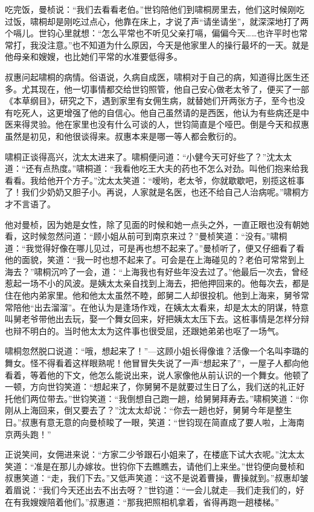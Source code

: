 \par 吃完饭，曼桢说：“我们去看看老伯。”世钧陪他们到啸桐房里去，他们这时候刚吃过饭，啸桐却是刚吃过点心，他靠在床上，才说了声“请坐请坐”，就深深地打了两个嗝儿。世钧心里就想：“怎么平常也不听见父亲打嗝，偏偏今天……也许平时也常常打，我没注意。”也不知道为什么原因，今天是他家里人的操行最坏的一天。就是他母亲和嫂嫂，也比她们平常的水准要低得多。
\par 叔惠问起啸桐的病情。俗语说，久病自成医，啸桐对于自己的病，知道得比医生还多。尤其现在，他一切事情都交给世钧照管，他自己安心做老太爷了，便买了一部《本草纲目》，研究之下，遇到家里有女佣生病，就替她们开两张方子，至今也没有吃死人，这更增强了他的自信心。他自己虽然请的是西医，他认为有些病还是中医来得灵验。他在家里也没有什么可谈的人，世钧简直是个哑巴。倒是今天和叔惠虽然是初见，和他很谈得来。叔惠本来是哪一等人都会敷衍的。
\par 啸桐正谈得高兴，沈太太进来了。啸桐便问道：“小健今天可好些了？”沈太太道：“还有点热度。”啸桐道：“我看他吃王大夫的药也不怎么对劲。叫他们抱来给我看看。我给他开个方子。”沈太太笑道：“嗳哟，老太爷，你就歇歇吧，别揽这桩事了！我们少奶奶又胆子小。再说，人家就是名医，也还不给自己人治病呢。”啸桐方才不言语了。
\par 他对曼桢，因为她是女性，除了见面的时候和她一点头之外，一直正眼也没有朝她看，这时候忽然问道：“顾小姐从前可到南京来过？”曼桢笑道：“没有。”啸桐道：“我觉得好像在哪儿见过，可是再也想不起来了。”曼桢听了，便又仔细看了看他的面貌，笑道：“我一时也想不起来了。可会是在上海碰见的？老伯可常常到上海去？”啸桐沉吟了一会，道：“上海我也有好些年没去过了。”他最后一次去，曾经惹起一场不小的风波。是姨太太亲自找到上海去，把他押回来的。他每次去，都是住在他内弟家里。他和他太太虽然不睦，郎舅二人却很投机。他到上海来，舅爷常常陪他“出去溜溜”。在他认为是逢场作戏，在姨太太看来，却是太太的阴谋，特意叫舅老爷带他出去玩，娶一个舞女回来，好把姨太太压下去。这桩事情是怎样分辩也辩不明白的。当时他太太为这件事也很受屈，还跟她弟弟也呕了一场气。
\par 啸桐忽然脱口说道：“哦，想起来了！”—这顾小姐长得像谁？活像一个名叫李璐的舞女。怪不得看着这样眼熟呢！他冒冒失失说了一声“想起来了”，一屋子人都向他看着，等着他的下文，他怎么能说出来，说人家像他从前认识的一个舞女。他顿了一顿，方向世钧笑道：“想起来了，你舅舅不是就要过生日了么，我们送的礼正好托他们两位带去。”世钧笑道：“我倒想自己跑一趟，给舅舅拜寿去。”啸桐笑道：“你刚从上海回来，倒又要去了？”沈太太却说：“你去一趟也好，舅舅今年是整生日。”叔惠有意无意的向曼桢睃了一眼，笑道：“世钧现在简直成了要人啦，上海南京两头跑！”
\par 正说笑间，女佣进来说：“方家二少爷跟石小姐来了，在楼底下试大衣呢。”沈太太笑道：“准是在那儿办嫁妆。世钧你下去瞧瞧去，请他们上来坐。”世钧便向曼桢和叔惠笑道：“走，我们下去。”又低声笑道：“这不是说着曹操，曹操就到。”叔惠却皱着眉说：“我们今天还出去不出去呀？”世钧道：“一会儿就走—我们走我们的，好在有我嫂嫂陪着他们。”叔惠道：“那我把照相机拿着，省得再跑一趟楼梯。”
